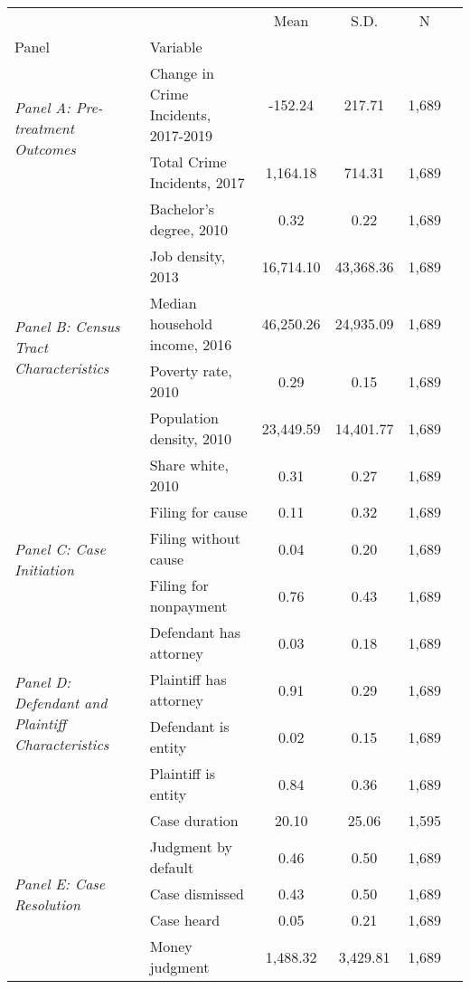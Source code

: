 \begin{tabular}{llcccc}
\toprule
 &  & Mean & S.D. & N \\
Panel & Variable &  &  &  \\
\midrule
\multirow[c]{2}{4cm}{\textit{Panel A: Pre-treatment Outcomes}} & Change in Crime Incidents, 2017-2019 & -152.24 & 217.71 & 1,689 \\
 & Total Crime Incidents, 2017 & 1,164.18 & 714.31 & 1,689 \\
\cline{1-5}
\multirow[c]{6}{4cm}{\textit{Panel B: Census Tract Characteristics}} & Bachelor's degree, 2010 & 0.32 & 0.22 & 1,689 \\
 & Job density, 2013 & 16,714.10 & 43,368.36 & 1,689 \\
 & Median household income, 2016 & 46,250.26 & 24,935.09 & 1,689 \\
 & Poverty rate, 2010 & 0.29 & 0.15 & 1,689 \\
 & Population density, 2010 & 23,449.59 & 14,401.77 & 1,689 \\
 & Share white, 2010 & 0.31 & 0.27 & 1,689 \\
\cline{1-5}
\multirow[c]{3}{4cm}{\textit{Panel C: Case Initiation}} & Filing for cause & 0.11 & 0.32 & 1,689 \\
 & Filing without cause & 0.04 & 0.20 & 1,689 \\
 & Filing for nonpayment & 0.76 & 0.43 & 1,689 \\
\cline{1-5}
\multirow[c]{4}{4cm}{\textit{Panel D: Defendant and Plaintiff Characteristics}} & Defendant has attorney & 0.03 & 0.18 & 1,689 \\
 & Plaintiff has attorney & 0.91 & 0.29 & 1,689 \\
 & Defendant is entity & 0.02 & 0.15 & 1,689 \\
 & Plaintiff is entity & 0.84 & 0.36 & 1,689 \\
\cline{1-5}
\multirow[c]{5}{4cm}{\textit{Panel E: Case Resolution}} & Case duration & 20.10 & 25.06 & 1,595 \\
 & Judgment by default & 0.46 & 0.50 & 1,689 \\
 & Case dismissed & 0.43 & 0.50 & 1,689 \\
 & Case heard & 0.05 & 0.21 & 1,689 \\
 & Money judgment & 1,488.32 & 3,429.81 & 1,689 \\
\cline{1-5}
\bottomrule
\end{tabular}
